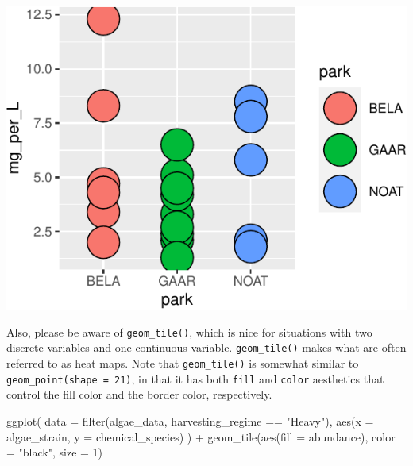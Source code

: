 \documentclass[
]{krantz}
\newenvironment{Shaded}{\begin{snugshade}}{\end{snugshade}}
\newcommand{\AttributeTok}[1]{\textcolor[rgb]{0.77,0.63,0.00}{#1}}
\newcommand{\DecValTok}[1]{\textcolor[rgb]{0.00,0.00,0.81}{#1}}
\newcommand{\FunctionTok}[1]{\textcolor[rgb]{0.00,0.00,0.00}{#1}}
\newcommand{\NormalTok}[1]{#1}
\newcommand{\SpecialCharTok}[1]{\textcolor[rgb]{0.00,0.00,0.00}{#1}}
\newcommand{\StringTok}[1]{\textcolor[rgb]{0.31,0.60,0.02}{#1}}
\begin{document}
\begin{center}\includegraphics{index_files/figure-latex/unnamed-chunk-54-1} \end{center}

Also, please be aware of \texttt{geom\_tile()}, which is nice for situations with two discrete variables and one continuous variable. \texttt{geom\_tile()} makes what are often referred to as heat maps. Note that \texttt{geom\_tile()} is somewhat similar to \texttt{geom\_point(shape\ =\ 21)}, in that it has both \texttt{fill} and \texttt{color} aesthetics that control the fill color and the border color, respectively.

\begin{Shaded}
\begin{Highlighting}[]
\FunctionTok{ggplot}\NormalTok{(}
  \AttributeTok{data =} \FunctionTok{filter}\NormalTok{(algae\_data, harvesting\_regime }\SpecialCharTok{==} \StringTok{"Heavy"}\NormalTok{),}
  \FunctionTok{aes}\NormalTok{(}\AttributeTok{x =}\NormalTok{ algae\_strain, }\AttributeTok{y =}\NormalTok{ chemical\_species)}
\NormalTok{) }\SpecialCharTok{+} 
  \FunctionTok{geom\_tile}\NormalTok{(}\FunctionTok{aes}\NormalTok{(}\AttributeTok{fill =}\NormalTok{ abundance), }\AttributeTok{color =} \StringTok{"black"}\NormalTok{, }\AttributeTok{size =} \DecValTok{1}\NormalTok{)}
\end{Highlighting}
\end{Shaded}
\end{document}
